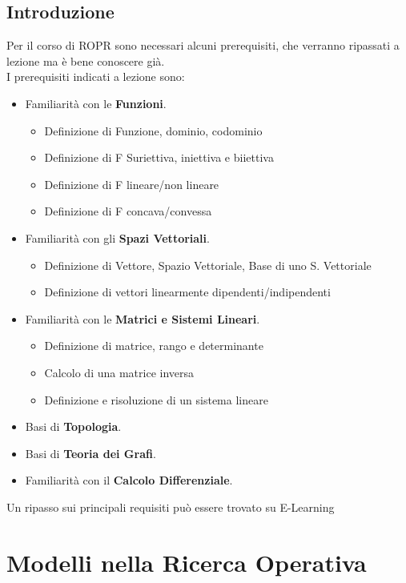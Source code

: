 \documentclass[12pt, a4paper, openany]{book}
\begin{document}
\section{Introduzione}
Per il corso di ROPR sono necessari alcuni prerequisiti, che verranno ripassati a lezione ma è bene conoscere già.
\\I prerequisiti indicati a lezione sono:
\begin{itemize}
    \item Familiarità con le \textbf{Funzioni}.
          \begin{itemize}
              \item Definizione di Funzione, dominio, codominio
              \item Definizione di F Suriettiva, iniettiva e biiettiva
              \item Definizione di F lineare/non lineare
              \item Definizione di F concava/convessa
          \end{itemize}
    \item Familiarità con gli \textbf{Spazi Vettoriali}.
          \begin{itemize}
              \item Definizione di Vettore, Spazio Vettoriale, Base di uno S. Vettoriale
              \item Definizione di vettori linearmente dipendenti/indipendenti
          \end{itemize}
    \item Familiarità con le \textbf{Matrici e Sistemi Lineari}.
          \begin{itemize}
              \item Definizione di matrice, rango e determinante
              \item Calcolo di una matrice inversa
              \item Definizione e risoluzione di un sistema lineare
          \end{itemize}
    \item Basi di \textbf{Topologia}.
    \item Basi di \textbf{Teoria dei Grafi}.
    \item Familiarità con il \textbf{Calcolo Differenziale}.
\end{itemize}
Un ripasso sui principali requisiti può essere trovato su E-Learning

\chapter{Modelli nella Ricerca Operativa}
\end{document}
